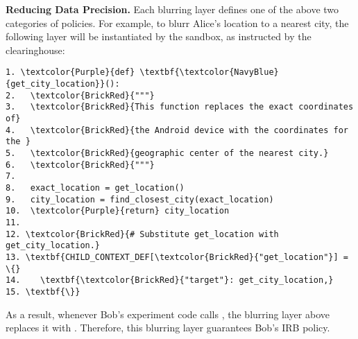 %
\textbf{Reducing Data Precision.}
Each blurring layer defines one of the above two categories of policies. 
For example, to blurr Alice's location to a nearest city, the following layer
will be instantiated by the sandbox, as instructed by the clearinghouse:

\begin{Verbatim}
1. \textcolor{Purple}{def} \textbf{\textcolor{NavyBlue}{get_city_location}}():
2.   \textcolor{BrickRed}{"""}
3.   \textcolor{BrickRed}{This function replaces the exact coordinates of} 
4.   \textcolor{BrickRed}{the Android device with the coordinates for the } 
5.   \textcolor{BrickRed}{geographic center of the nearest city.}
6.   \textcolor{BrickRed}{"""}
7.
8.   exact_location = get_location()
9.   city_location = find_closest_city(exact_location)
10.  \textcolor{Purple}{return} city_location
11.
12. \textcolor{BrickRed}{# Substitute get_location with get_city_location.}
13. \textbf{CHILD_CONTEXT_DEF[\textcolor{BrickRed}{"get_location"}] = \{}
14.    \textbf{\textcolor{BrickRed}{"target"}: get_city_location,}
15. \textbf{\}}
\end{Verbatim}

As a result, whenever Bob's experiment code calls , 
the blurring layer above replaces it with . Therefore,
this blurring layer guarantees Bob's IRB policy.

